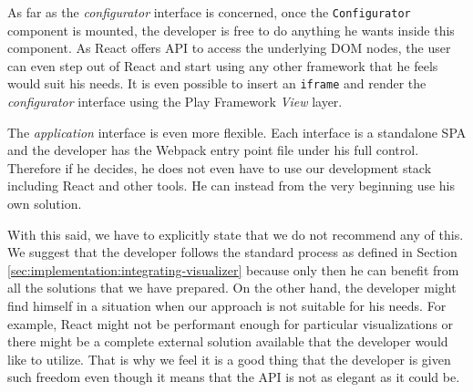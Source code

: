 As far as the \emph{configurator} interface is concerned, once the \texttt{Configurator} component is mounted, the developer is free to do anything he wants inside this component. As React offers API to access the underlying DOM nodes, the user can even step out of React and start using any other framework that he feels would suit his needs. It is even possible to insert an \texttt{iframe} and render the \emph{configurator} interface using the Play Framework \emph{View} layer.

The \emph{application} interface is even more flexible. Each interface is a standalone SPA and the developer has the Webpack entry point file under his full control. Therefore if he decides, he does not even have to use our development stack including React and other tools. He can instead from the very beginning use his own solution.

With this said, we have to explicitly state that we do not recommend any of this. We suggest that the developer follows the standard process as defined in Section \ref{sec:implementation:integrating-visualizer} because only then he can benefit from all the solutions that we have prepared. On the other hand, the developer might find himself in a situation when our approach is not suitable for his needs. For example, React might not be performant enough for particular visualizations or there might be a complete external solution available that the developer would like to utilize. That is why we feel it is a good thing that the developer is given such freedom even though it means that the API is not as elegant as it could be.
   